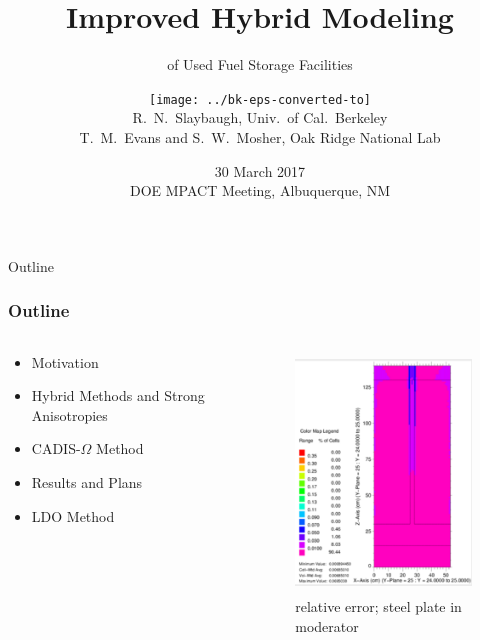 \documentclass[handout]{beamer}
\title{Improved Hybrid Modeling}
\subtitle{of Used Fuel Storage Facilities}
\author{\texttt{[image: ../bk-eps-converted-to]}\\R.\ N.\ Slaybaugh, Univ.\ of Cal.\ Berkeley\\[1ex]
T.\ M.\ Evans and S.\ W.\ Mosher, Oak Ridge National Lab}
\date{30 March 2017 \\ DOE MPACT Meeting, Albuquerque, NM}
\renewcommand{\(}{\begin{columns}}
\renewcommand{\)}{\end{columns}}
\newcommand{\<}[1]{\begin{column}{#1}}
\renewcommand{\>}{\end{column}}
\begin{document}
\begin{frame}
\titlepage
\end{frame}

\begin{frame}[fragile]{Outline}
  \frametitle{Outline}

\begin{columns}
  \begin{column}{0.5\textwidth}
    \begin{itemize}
    \item Motivation
    \vspace*{.75em}
    \item Hybrid Methods and Strong Anisotropies
    \vspace*{.75em}
	\item CADIS-$\Omega$ Method
    \vspace*{.75em}
	\item Results and Plans
    \vspace*{.75em}
	\item LDO Method
  \end{itemize}
  \end{column}
  \begin{column}{0.5\textwidth}
  	\begin{figure}
  	\begin{center}
  		\includegraphics[height=2.5in,clip]{plate-air}
		\caption{relative error; steel plate in moderator \cite{Wilson2015}}
	\end{center}
  	\end{figure}
  \end{column}
\end{columns}

\end{frame}
\end{document}
